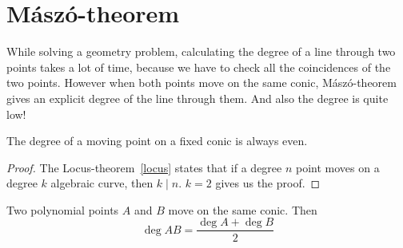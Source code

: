 \documentclass[a4paper]{article}
\begin{document}
\section{Mászó-theorem}

While solving a geometry problem, calculating the degree of a line through two points takes a lot of time, because we have to  check all the coincidences of the two points. However when both points move on the same conic, Mászó-theorem gives an explicit degree of the line through them. And also the degree is quite low!

\begin{lemma}
    The degree of a moving point on a fixed conic is always even.
\end{lemma}
\begin{proof}
    The Locus-theorem~\ref{locus} states that if a degree $n$ point moves on a degree $k$ algebraic curve, then $k\mid n$. $k=2$ gives us the proof.
\end{proof}
\begin{theorem}
Two polynomial points $A$ and $B$ move on the same conic. Then
$$\deg AB = \frac{\deg A+\deg B}{2}$$

\end{theorem}
\end{document}
